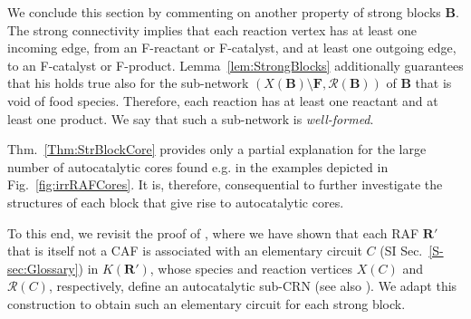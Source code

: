 \documentclass[pdflatex]{sn-jnl}
\theoremstyle{thmstyleone}%
\theoremstyle{examplesty}%
\theoremstyle{thmstylethree}%
\newcommand{\king}{K}
\newcommand{\food}{\ensuremath{\mathbf{F}}}
\newcommand{\CR}[0]{\mathcal{R}}
\newcommand{\RAF}[0]{\mathbf{R}'}
\newcommand{\block}[0]{\mathbf{B}}
\newcommand{\holy}[1]{\begingroup\color{royalpurple}#1\endgroup}
\begin{document}
\holy{We conclude this section by commenting on another property of strong blocks $\block$. The strong connectivity implies that each reaction vertex has at least one incoming edge, from an F-reactant or F-catalyst, and at least one outgoing edge, to an F-catalyst or F-product. Lemma~\ref{lem:StrongBlocks} additionally guarantees that his holds true also for the sub-network $(X(\block)\setminus \food, \CR(\block))$ of $\block$ that is void of food species. Therefore, each reaction has at least one reactant and at least one product. We say that such a sub-network is \emph{well-formed}. 
}





\holy{
Thm.~\ref{Thm:StrBlockCore}  provides only a partial explanation for the large number of autocatalytic cores found e.g. in the examples depicted in Fig.~\ref{fig:irrRAFCores}. It is, therefore, consequential to further investigate the structures of each block that give rise to autocatalytic cores. 


To this end, we revisit the proof of \cite[Thm.~3.1]{golnik_bridging_2026}, where we have shown that each RAF $\RAF$ that is itself not a CAF is associated with an elementary circuit $C$ (SI Sec.~\ref{S-sec:Glossary}) in $\king(\RAF)$, whose species and reaction vertices $X(C)$ and $\CR(C)$, respectively, define an autocatalytic sub-CRN (see also \cite[Remark~13]{golnik_bridging_2026}). We adapt this construction to obtain such an elementary circuit for each strong block.

}
\end{document}
